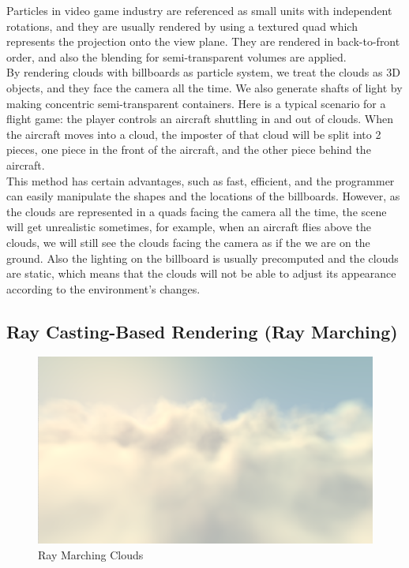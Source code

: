 Particles in video game industry are referenced as small units with independent rotations, and they are usually rendered by using a textured quad which represents the projection onto the view plane. They are rendered in back-to-front order, and also the blending for semi-transparent volumes are applied.\\
By rendering clouds with billboards as particle system, we treat the clouds as 3D objects, and they face the camera all the time. We also generate shafts of light by making concentric semi-transparent containers. Here is a typical scenario for a flight game: the player controls an aircraft shuttling in and out of clouds. When the aircraft moves into a cloud, the imposter of that cloud will be split into 2 pieces, one piece in the front of the aircraft, and the other piece behind the aircraft.\\
This method has certain advantages, such as fast, efficient, and the programmer can easily manipulate the shapes and the locations of the billboards. However, as the clouds are represented in a quads facing the camera all the time, the scene will get unrealistic sometimes, for example, when an aircraft flies above the clouds, we will still see the clouds facing the camera as if the we are on the ground. Also the lighting on the billboard is usually precomputed and the clouds are static, which means that the clouds will not be able to adjust its appearance according to the environment's changes.

\subsection{Ray Casting-Based Rendering (Ray Marching)}

\begin{figure}[htp]
\begin{center}
\includegraphics[scale=0.5]{images/raymarching.png}
\caption{Ray Marching Clouds}
\label{f3}
\end{center}
\end{figure}

